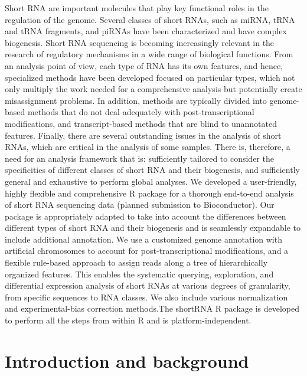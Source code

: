 \documentclass[12pt,twoside]{reedthesis}
\begin{document}
Short RNA are important molecules that play key functional roles in the
regulation of the genome. Several classes of short RNAs, such as miRNA,
tRNA and tRNA fragments, and piRNAs have been characterized and have
complex biogenesis. Short RNA sequencing is becoming increasingly
relevant in the research of regulatory mechanisms in a wide range of
biological functions. From an analysis point of view, each type of RNA
has its own features, and hence, specialized methods have been developed
focused on particular types, which not only multiply the work needed for
a comprehensive analysis but potentially create misassignment problems.
In addition, methods are typically divided into genome-based methods
that do not deal adequately with post-transcriptional modifications, and
transcript-based methods that are blind to unannotated features.
Finally, there are several outstanding issues in the analysis of short
RNAs, which are critical in the analysis of some samples. There is,
therefore, a need for an analysis framework that is: sufficiently
tailored to consider the specificities of different classes of short RNA
and their biogenesis, and sufficiently general and exhaustive to perform
global analyses. We developed a user-friendly, highly flexible and
comprehensive R package for a thorough end-to-end analysis of short RNA
sequencing data (planned submission to Bioconductor). Our package is
appropriately adapted to take into account the differences between
different types of short RNA and their biogenesis and is seamlessly
expandable to include additional annotation. We use a customized genome
annotation with artificial chromosomes to account for
post-transcriptional modifications, and a flexible rule-based approach
to assign reads along a tree of hierarchically organized features. This
enables the systematic querying, exploration, and differential
expression analysis of short RNAs at various degrees of granularity,
from specific sequences to RNA classes. We also include various
normalization and experimental-bias correction methods.The shortRNA R
package is developed to perform all the steps from within R and is
platform-independent.

\hypertarget{introduction-and-background}{%
\section{Introduction and background}\label{introduction-and-background}}
\end{document}
